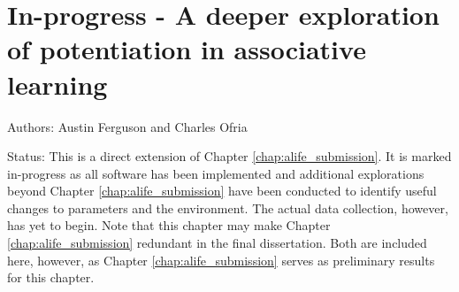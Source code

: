 
\chapter{In-progress - A deeper exploration of potentiation in associative learning}
\label{chap:replaying_associative_learning}

\noindent
Authors: Austin Ferguson and Charles Ofria

\noindent
Status: This is a direct extension of Chapter \ref{chap:alife_submission}.
It is marked in-progress as all software has been implemented and additional explorations beyond Chapter \ref{chap:alife_submission} have been conducted to identify useful changes to parameters and the environment. 
The actual data collection, however, has yet to begin. 
Note that this chapter may make Chapter \ref{chap:alife_submission} redundant in the final dissertation.
Both are included here, however, as Chapter \ref{chap:alife_submission} serves as preliminary results for this chapter. 


